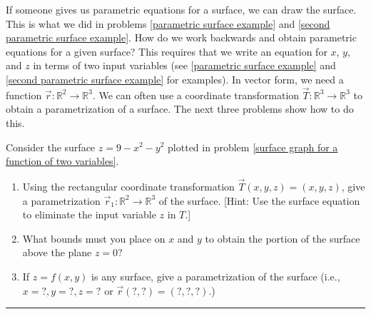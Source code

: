 If someone gives us parametric equations for a surface, we can draw the surface. This is what we did in problems \ref{parametric surface example} and \ref{second parametric surface example}. 
How do we work backwards and obtain parametric equations for a given surface?
This requires that we write an equation for $x$, $y$, and $z$ in terms of two input variables (see \ref{parametric surface example} and \ref{second parametric surface example} for examples). 
In vector form, we need a function $\vec r:\mathbb{R}^2\to\mathbb{R}^3$. 
We can often use a coordinate transformation $\vec T:\mathbb{R}^3\to\mathbb{R}^3$ to obtain a parametrization of a surface. 
The next three problems show how to do this.   
\begin{problem}\label{3d parametric plot}
 Consider the surface $z=9-x^2-y^2$ plotted in problem \ref{surface graph for a function of two variables}.
\begin{enumerate}
 \item 
Using the rectangular coordinate transformation $\vec T(x,y,z)=(x,y,z)$, give a parametrization $\vec r_1:\mathbb{R}^2\to\mathbb{R}^3$ of the surface.  
[Hint: Use the surface equation to eliminate the input variable $z$ in $T$.]
 \item What bounds must you place on $x$ and $y$ to obtain the portion of the surface above the plane $z=0$?
 \item If $z=f(x,y)$ is any surface, give a parametrization of the surface (i.e., $x=?, y=?, z=?$ or $\vec r (?,?)=(?,?,?)$.)
\end{enumerate}

\hrule\end{problem}
